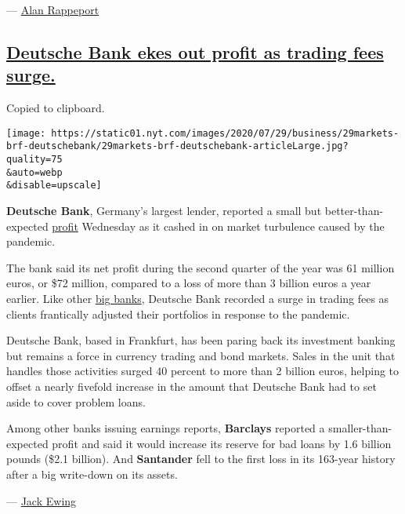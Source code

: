 --- \href{https://www.nytimes.com/by/alan-rappeport}{Alan Rappeport}

\hypertarget{deutsche-bank-ekes-out-profit-as-trading-fees-surge}{%
\subsection{\texorpdfstring{\protect\hyperlink{deutsche-bank-ekes-out-profit-as-trading-fees-surge}{Deutsche
Bank ekes out profit as trading fees
surge.}}{Deutsche Bank ekes out profit as trading fees surge.}}\label{deutsche-bank-ekes-out-profit-as-trading-fees-surge}}

Copied to clipboard.

\texttt{[image: https://static01.nyt.com/images/2020/07/29/business/29markets-brf-deutschebank/29markets-brf-deutschebank-articleLarge.jpg?quality=75\\\&auto=webp\\\&disable=upscale]}

\textbf{Deutsche Bank}, Germany's largest lender, reported a small but
better-than-expected
\href{https://www.db.com/newsroom_news/2020/deutsche-bank-reports-pre-tax-profit-of-158-million-euros-in-second-quarter-of-2020-with-transformation-fully-on-en-11651.htm}{profit}
Wednesday as it cashed in on market turbulence caused by the pandemic.

The bank said its net profit during the second quarter of the year was
61 million euros, or \$72 million, compared to a loss of more than 3
billion euros a year earlier. Like other
\href{https://www.nytimes.com/2020/07/14/business/big-banks-quarterly-results.html?searchResultPosition=4}{big
banks}, Deutsche Bank recorded a surge in trading fees as clients
frantically adjusted their portfolios in response to the pandemic.

Deutsche Bank, based in Frankfurt, has been paring back its investment
banking but remains a force in currency trading and bond markets. Sales
in the unit that handles those activities surged 40 percent to more than
2 billion euros, helping to offset a nearly fivefold increase in the
amount that Deutsche Bank had to set aside to cover problem loans.

Among other banks issuing earnings reports, \textbf{Barclays} reported a
smaller-than-expected profit and said it would increase its reserve for
bad loans by 1.6 billion pounds (\$2.1 billion). And \textbf{Santander}
fell to the first loss in its 163-year history after a big write-down on
its assets.

--- \href{https://www.nytimes.com/by/jack-ewing}{Jack Ewing}

